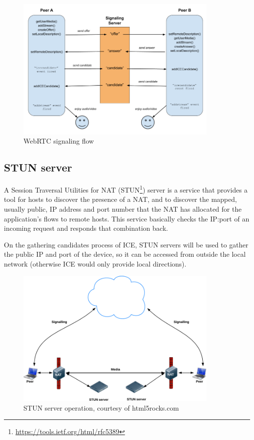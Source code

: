 \documentclass[paper=a4, fontsize=11pt]{scrartcl} %
\numberwithin{equation}{section} %
\numberwithin{figure}{section} %
\numberwithin{table}{section} %
\begin{document}
\begin{figure}[ht!]
	\centering
	\includegraphics[width=375px]{signaling.png}
	\caption{WebRTC signaling flow}
\end{figure}

\subsection{STUN server}

A Session Traversal Utilities for NAT (STUN\footnote{\url{https://tools.ietf.org/html/rfc5389}}) server is a service that provides a tool for hosts to discover the presence of a NAT, and to discover the mapped, usually public, IP address and port number that the NAT has allocated for the application's flows to remote hosts. This service basically checks the IP:port of an incoming request and responds that combination back.

On the gathering candidates process of ICE, STUN servers will be used to gather the public IP and port of the device, so it can be accessed from outside the local network (otherwise ICE would only provide local directions).

\begin{figure}[ht!]
	\centering
	\includegraphics[width=375px]{stun.png}
	\caption{STUN server operation, courtesy of html5rocks.com}
\end{figure}
\end{document}
